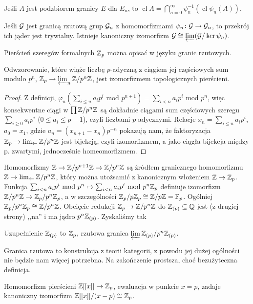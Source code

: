 \begin{fakt}
	Jeśli $A$ jest podzbiorem granicy $E$ dla $E_n$, to $\operatorname{cl} A = \bigcap_{n=0}^\infty \psi_n^{-1} (\operatorname{cl} \psi_n (A))$.
\end{fakt}

\begin{fakt}
	Jeśli $\mathcal G$ jest granicą rzutową grup $\mathcal G_n$ z homomorfizmami $\psi_n \colon \mathcal G \to \mathcal G_n$, to przekrój ich jąder jest trywialny.
	Istnieje kanoniczny izomorfizm $\mathcal G \cong \varprojlim (\mathcal G / \ker \psi_n)$.
\end{fakt}

Pierścień szeregów formalnych $\mathbb Z_p$ można opisać w języku granic rzutowych.

\begin{fakt}
	Odwzorowanie, które wiąże liczbę $p$-adyczną z ciągiem jej częściowych sum modulo ${p^n}$, $\mathbb Z_p \to \varprojlim_n \mathbb Z/p^n\mathbb Z$, jest izomorfizmem topologicznych pierścieni.
\end{fakt}

\begin{proof}
	Z definicji, $\varphi_n (\sum_{i \le n} a_ip^i \mbox{ mod } {p^{n+1}}) = \sum_{i<n} a_ip^i \mbox{ mod } {p^n}$, więc konsekwentne ciągi w $\prod \mathbb Z/p^n\mathbb Z$ są dokładnie ciągami sum częściowych szeregu $\sum_{i \ge 0} a_i p^i$ ($0 \le a_i\le p-1$), czyli liczbami $p$-adycznymi.
	Relacje $x_n = \sum_{i \le n} a_ip^i$, $a_0 = x_1$, gdzie $a_n = (x_{n+1} - x_n)p^{-n}$ pokazują nam, że faktoryzacja $\mathbb Z_p \to \lim_{\leftarrow} \mathbb Z/p^n\mathbb Z$ jest bijekcją, czyli izomorfizmem, a jako ciągła bijekcja między p. zwartymi, jednocześnie homeomorfizmem.
\end{proof}

Homomorfizmy $\mathbb Z \to \mathbb Z/p^{n+1} \mathbb Z \to \mathbb Z/p^n\mathbb Z$ są źródłem granicznego homomorfizmu $\mathbb Z \to \lim_{\leftarrow} \mathbb Z/p^n\mathbb Z$, który można utożsamić z kanonicznym włożeniem $\mathbb Z \to \mathbb Z_p$.
Funkcja $\sum_{i < n} a_ip^i \mbox{ mod } {p^n} \mapsto \sum_{i<n} a_ip^i \mbox{ mod } {p^n \mathbb Z_p}$ definiuje izomorfizm $\mathbb Z/p^n\mathbb Z \to \mathbb Z_p/p^n\mathbb Z_p$, a w szczególności $\mathbb Z_p / p\mathbb Z_p \cong \mathbb Z/p\mathbb Z = \mathbb F_p$.
Ogólniej $\mathbb Z_p/p^n \mathbb Z_p \cong \mathbb Z/p^n\mathbb Z$.
Obcięcie redukcji $\mathbb Z_p \to \mathbb Z/p^n\mathbb Z$ do $\mathbb Z_{(p)} \subseteq \mathbb Q$ jest (z drugiej strony) ,,na'' i ma jądro $p^n\mathbb Z_{(p)}$.
Zyskaliśmy tak

\begin{fakt}
	Uzupełnienie $\mathbb Z_{(p)}$ to $\mathbb Z_p$, rzutowa granica $\varprojlim \mathbb Z_{(p)} / p^n\mathbb Z_{(p)}$.
\end{fakt}

Granica rzutowa to konstrukcja z teorii kategorii, z powodu jej dużej ogólności nie będzie nam więcej potrzebna.
Na zakończenie prostsza, choć bezużyteczna definicja.

\begin{fakt}
	Homomorfizm pierścieni $\mathbb Z[[x]] \to \mathbb Z_p$, ewaluacja w punkcie $x = p$, zadaje kanoniczny izomorfizm $\mathbb Z[[x]] / (x-p) \cong \mathbb Z_p$.
\end{fakt}
